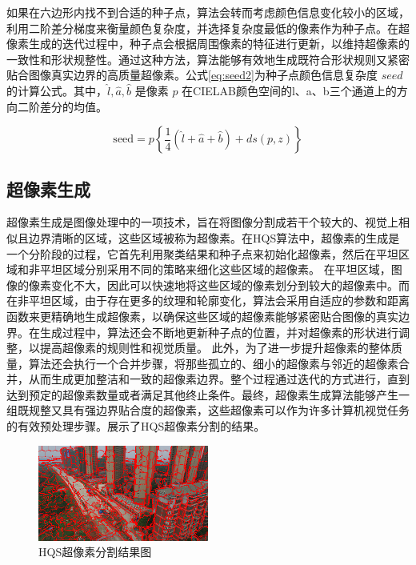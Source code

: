 如果在六边形内找不到合适的种子点，算法会转而考虑颜色信息变化较小的区域，利用二阶差分梯度来衡量颜色复杂度，并选择复杂度最低的像素作为种子点。在超像素生成的迭代过程中，种子点会根据周围像素的特征进行更新，以维持超像素的一致性和形状规整性。通过这种方法，算法能够有效地生成既符合形状规则又紧密贴合图像真实边界的高质量超像素。公式\eqref{eq:seed2}为种子点颜色信息复杂度 \( seed \) 的计算公式。其中，\( \hat{l}, \hat{a}, \hat{b} \) 是像素 \( p \) 在CIELAB颜色空间的l、a、b三个通道上的方向二阶差分的均值。

\begin{equation}
  \text{seed} = p \left\{ \frac{1}{4}(\hat{l} + \hat{a} + \hat{b}) + ds(p, z) \right\}
  \label{eq:seed2}
\end{equation}

\subsection{超像素生成}
超像素生成是图像处理中的一项技术，旨在将图像分割成若干个较大的、视觉上相似且边界清晰的区域，这些区域被称为超像素。在HQS算法中，超像素的生成是一个分阶段的过程，它首先利用聚类结果和种子点来初始化超像素，然后在平坦区域和非平坦区域分别采用不同的策略来细化这些区域的超像素。
在平坦区域，图像的像素变化不大，因此可以快速地将这些区域的像素划分到较大的超像素中。而在非平坦区域，由于存在更多的纹理和轮廓变化，算法会采用自适应的参数和距离函数来更精确地生成超像素，以确保这些区域的超像素能够紧密贴合图像的真实边界。在生成过程中，算法还会不断地更新种子点的位置，并对超像素的形状进行调整，以提高超像素的规则性和视觉质量。
此外，为了进一步提升超像素的整体质量，算法还会执行一个合并步骤，将那些孤立的、细小的超像素与邻近的超像素合并，从而生成更加整洁和一致的超像素边界。整个过程通过迭代的方式进行，直到达到预定的超像素数量或者满足其他终止条件。最终，超像素生成算法能够产生一组既规整又具有强边界贴合度的超像素，这些超像素可以作为许多计算机视觉任务的有效预处理步骤。展示了HQS超像素分割的结果。

\begin{figure}[htbp]
	\centering
    \includegraphics[width=0.5\textwidth]{pic/hqs/500/2.png}
	\caption{HQS超像素分割结果图}
      \label{fig:hqs}
\end{figure}


